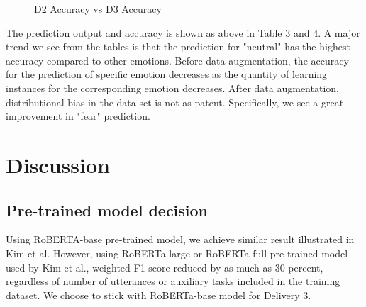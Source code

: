 \documentclass[11pt]{article}
\begin{document}
\begin{figure}
\caption{D2 Accuracy vs D3 Accuracy}
\label{fig:stats}
\end{figure}


The prediction output and accuracy is shown as above in Table 3 and 4. A major trend we see from the tables is that the prediction for "neutral" has the highest accuracy compared to other emotions. Before data augmentation, the accuracy for the prediction of specific emotion decreases as the quantity of learning instances for the corresponding emotion decreases. After data augmentation, distributional bias in the data-set is not as patent. Specifically, we see a great improvement in "fear" prediction.

\section{Discussion}

\subsection{Pre-trained model decision}

Using RoBERTA-base pre-trained model, we achieve similar result illustrated in Kim et al. However, using RoBERTa-large or RoBERTa-full pre-trained model used by Kim et al., weighted F1 score reduced by as much as 30 percent, regardless of number of utterances or auxiliary tasks included in the training dataset. We choose to stick with RoBERTa-base model for Delivery 3.
\end{document}
